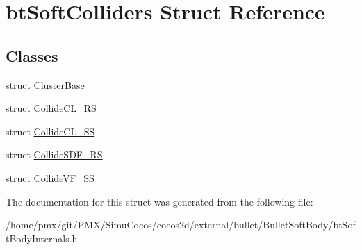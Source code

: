 \hypertarget{structbtSoftColliders}{}\section{bt\+Soft\+Colliders Struct Reference}
\label{structbtSoftColliders}
\subsection*{Classes}
\begin{DoxyCompactItemize}
\item 
struct \hyperlink{structbtSoftColliders_1_1ClusterBase}{Cluster\+Base}
\item 
struct \hyperlink{structbtSoftColliders_1_1CollideCL__RS}{Collide\+C\+L\+\_\+\+RS}
\item 
struct \hyperlink{structbtSoftColliders_1_1CollideCL__SS}{Collide\+C\+L\+\_\+\+SS}
\item 
struct \hyperlink{structbtSoftColliders_1_1CollideSDF__RS}{Collide\+S\+D\+F\+\_\+\+RS}
\item 
struct \hyperlink{structbtSoftColliders_1_1CollideVF__SS}{Collide\+V\+F\+\_\+\+SS}
\end{DoxyCompactItemize}


The documentation for this struct was generated from the following file\+:\begin{DoxyCompactItemize}
\item 
/home/pmx/git/\+P\+M\+X/\+Simu\+Cocos/cocos2d/external/bullet/\+Bullet\+Soft\+Body/bt\+Soft\+Body\+Internals.\+h\end{DoxyCompactItemize}
